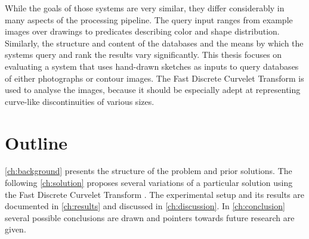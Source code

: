 While the goals of those systems are very similar, they differ considerably in
many aspects of the processing pipeline. The query input ranges from example
images over drawings to predicates describing color and shape distribution.
Similarly, the structure and content of the databases and the means by which
the systems query and rank the results vary significantly. This thesis focuses
on evaluating a system that uses hand-drawn sketches as inputs to query
databases of either photographs or contour images. The Fast Discrete Curvelet
Transform \autocite{candes_fast_2006} is used to analyse the images, because it
should be especially adept at representing curve-like discontinuities of
various sizes.

\section{Outline}

\autoref{ch:background} presents the structure of the problem and prior
solutions. The following \autoref{ch:solution} proposes several variations of a
particular solution using the Fast Discrete Curvelet Transform
\autocite{candes_fast_2006}. The experimental setup and its results are
documented in \autoref{ch:results} and discussed in \autoref{ch:discussion}. In
\autoref{ch:conclusion} several possible conclusions are drawn and pointers
towards future research are given.

